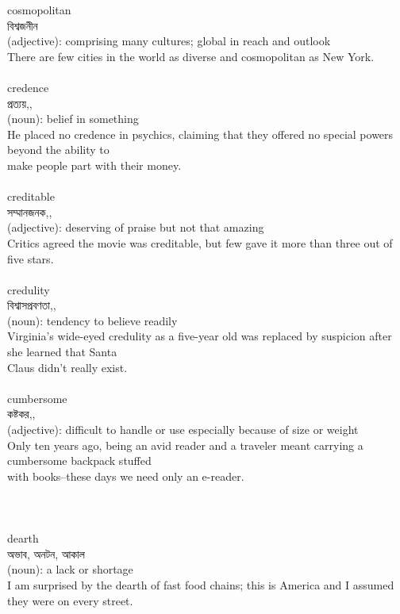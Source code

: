 \documentclass{article}
\begin{document}
{cosmopolitan}\\
{বিশ্বজনীন}\\
{(adjective): comprising many cultures; global in reach and outlook\\There are few cities in the world as diverse and cosmopolitan as New York.\\}\\
{credence}\\
{প্রত্যয়,,}\\
{(noun): belief in something\\He placed no credence in psychics, claiming that they offered no special powers beyond the ability to\\make people part with their money.\\}\\
{creditable}\\
{সম্মানজনক,,}\\
{(adjective): deserving of praise but not that amazing\\Critics agreed the movie was creditable, but few gave it more than three out of five stars.\\}\\
{credulity}\\
{বিশ্বাসপ্রবণতা,,}\\
{(noun): tendency to believe readily\\Virginia's wide-eyed credulity as a five-year old was replaced by suspicion after she learned that Santa\\Claus didn't really exist.\\}\\
{cumbersome}\\
{কষ্টকর,,}\\
{(adjective): difficult to handle or use especially because of size or weight\\Only ten years ago, being an avid reader and a traveler meant carrying a cumbersome backpack stuffed\\with books--these days we need only an e-reader.\\\\                                                                                \\}\\
{dearth}\\
{অভাব, অনটন, আকাল}\\
{(noun): a lack or shortage\\I am surprised by the dearth of fast food chains; this is America and I assumed they were on every street.\\}\\
\end{document}
